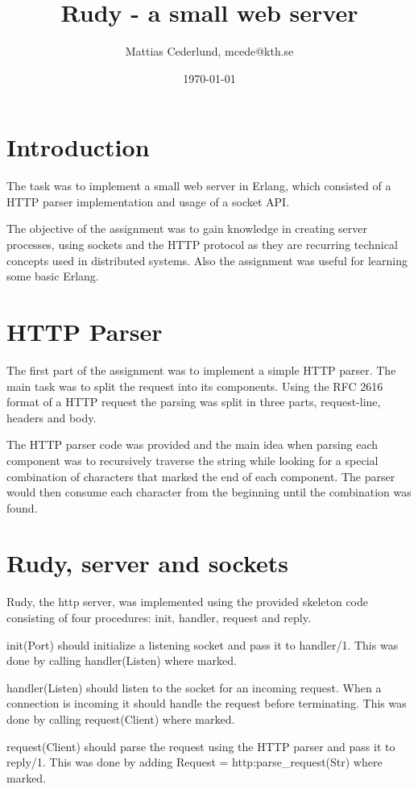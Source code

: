 \documentclass[a4paper, 11pt]{article}
\title{Rudy - a small web server }
\author{Mattias Cederlund, mcede@kth.se}
\date{\today{}}
\begin{document}
\maketitle

\section{Introduction}

The task was to implement a small web server in Erlang, which consisted of a HTTP parser implementation and usage of a socket API. 

The objective of the assignment was to gain knowledge in creating server processes, using sockets and the HTTP protocol as they are recurring technical concepts used in distributed systems. Also the assignment was useful for learning some basic Erlang.

\section{HTTP Parser}

The first part of the assignment was to implement a simple HTTP parser. The main task was to split the request into its components. Using the RFC 2616 format of a HTTP request the parsing was split in three parts, request-line, headers and body.

The HTTP parser code was provided and the main idea when parsing each component was to recursively traverse the string while looking for a special combination of characters that marked the end of each component. The parser would then consume each character from the beginning until the combination was found. 

\section{Rudy, server and sockets}

Rudy, the http server, was implemented using the provided skeleton code consisting of four procedures: init, handler, request and reply.

init(Port) should initialize a listening socket and pass it to handler/1. This was done by calling handler(Listen) where marked.

handler(Listen) should listen to the socket for an incoming request. When a connection is incoming it should handle the request before terminating. This was done by calling request(Client) where marked.

request(Client) should parse the request using the HTTP parser and pass it to reply/1. This was done by adding Request = http:parse\_request(Str) where marked.
\end{document}
